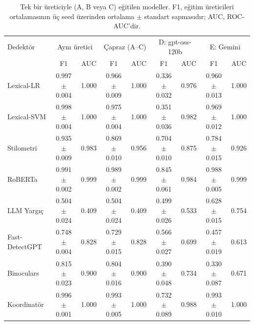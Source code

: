 \begin{table}[t]
\centering
\footnotesize
\caption{Tek bir üreticiyle (A, B veya C) eğitilen modeller. F1, eğitim üreticileri ortalamasının üç seed üzerinden ortalama $\pm$ standart sapmasıdır; AUC, ROC-AUC'dir.}
\label{tab:main}
\begin{tabular}{lcccccccc}
\toprule
Dedektör & \multicolumn{2}{c}{Aynı üretici} & \multicolumn{2}{c}{Çapraz (A--C)} & \multicolumn{2}{c}{D: gpt-oss-120b} & \multicolumn{2}{c}{E: Gemini} \\
 & F1 & AUC & F1 & AUC & F1 & AUC & F1 & AUC \\
\midrule
Lexical-LR & 0.997 $\pm$ 0.004 & 1.000 & 0.966 $\pm$ 0.009 & 1.000 & 0.336 $\pm$ 0.032 & 0.976 & 0.960 $\pm$ 0.013 & 1.000 \\
Lexical-SVM & 0.998 $\pm$ 0.004 & 1.000 & 0.975 $\pm$ 0.004 & 1.000 & 0.351 $\pm$ 0.036 & 0.982 & 0.969 $\pm$ 0.012 & 1.000 \\
Stilometri & 0.935 $\pm$ 0.009 & 0.983 & 0.869 $\pm$ 0.010 & 0.956 & 0.704 $\pm$ 0.010 & 0.875 & 0.784 $\pm$ 0.015 & 0.926 \\
RoBERTa & 0.991 $\pm$ 0.002 & 0.999 & 0.989 $\pm$ 0.002 & 0.999 & 0.845 $\pm$ 0.061 & 0.984 & 0.988 $\pm$ 0.005 & 0.999 \\
LLM Yargıç & 0.504 $\pm$ 0.024 & 0.409 & 0.504 $\pm$ 0.024 & 0.409 & 0.499 $\pm$ 0.026 & 0.533 & 0.628 $\pm$ 0.015 & 0.754 \\
Fast-DetectGPT & 0.748 $\pm$ 0.004 & 0.828 & 0.729 $\pm$ 0.015 & 0.828 & 0.566 $\pm$ 0.027 & 0.699 & 0.457 $\pm$ 0.019 & 0.613 \\
Binoculars & 0.815 $\pm$ 0.023 & 0.900 & 0.804 $\pm$ 0.016 & 0.900 & 0.390 $\pm$ 0.048 & 0.734 & 0.330 $\pm$ 0.087 & 0.671 \\
Koordinatör & 0.996 $\pm$ 0.001 & 1.000 & 0.993 $\pm$ 0.005 & 1.000 & 0.732 $\pm$ 0.089 & 0.988 & 0.993 $\pm$ 0.010 & 1.000 \\
\bottomrule
\end{tabular}
\end{table}
